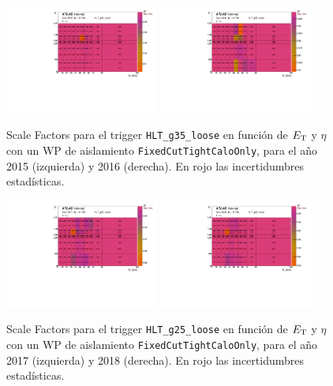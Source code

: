 
\begin{figure}[!htpb]
  \centering
      {\includegraphics[width=0.45\textwidth]{images/trigger/2015_h_sf_et_eta_tr_HLT_g35_loose_FixedCutTightCaloOnly.pdf}}
      {\includegraphics[width=0.45\textwidth]{images/trigger/2016_h_sf_et_eta_tr_HLT_g35_loose_FixedCutTightCaloOnly.pdf}}
      \caption{Scale Factors para el trigger \texttt{HLT\_g35\_loose} en función de $E_{\text{T}}$ y $\eta$ con un WP de aislamiento \texttt{FixedCutTightCaloOnly}, para el año 2015 (izquierda) y 2016 (derecha). En rojo las incertidumbres estadísticas.}
      \label{fig:SFs_2015_2016}
\end{figure}
\begin{figure}[!htpb]
  \centering
      {\includegraphics[width=0.45\textwidth]{images/trigger/2017_h_sf_et_eta_tr_HLT_g25_loose_FixedCutTightCaloOnly.pdf}}
      {\includegraphics[width=0.45\textwidth]{images/trigger/2018_h_sf_et_eta_tr_HLT_g25_loose_FixedCutTightCaloOnly.pdf}}
      \caption{Scale Factors para el trigger \texttt{HLT\_g25\_loose} en función de $E_{\text{T}}$ y $\eta$ con un WP de aislamiento \texttt{FixedCutTightCaloOnly}, para el año 2017 (izquierda) y 2018 (derecha). En rojo las incertidumbres estadísticas.}
      \label{fig:SFs_2017_2018}
\end{figure}


